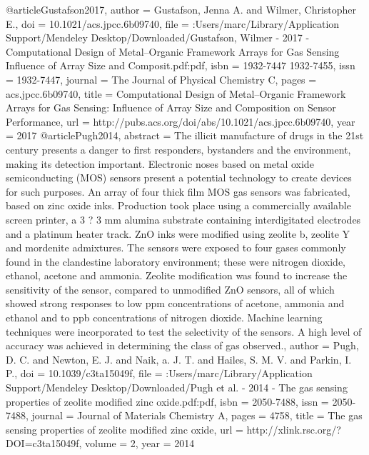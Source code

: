 @article{Gustafson2017,
author = {Gustafson, Jenna A. and Wilmer, Christopher E.},
doi = {10.1021/acs.jpcc.6b09740},
file = {:Users/marc/Library/Application Support/Mendeley Desktop/Downloaded/Gustafson, Wilmer - 2017 - Computational Design of Metal–Organic Framework Arrays for Gas Sensing Influence of Array Size and Composit.pdf:pdf},
isbn = {1932-7447
1932-7455},
issn = {1932-7447},
journal = {The Journal of Physical Chemistry C},
pages = {acs.jpcc.6b09740},
title = {{Computational Design of Metal–Organic Framework Arrays for Gas Sensing: Influence of Array Size and Composition on Sensor Performance}},
url = {http://pubs.acs.org/doi/abs/10.1021/acs.jpcc.6b09740},
year = {2017}
}
@article{Pugh2014,
abstract = {The illicit manufacture of drugs in the 21st century presents a danger to first responders, bystanders and the environment, making its detection important. Electronic noses based on metal oxide semiconducting (MOS) sensors present a potential technology to create devices for such purposes. An array of four thick film MOS gas sensors was fabricated, based on zinc oxide inks. Production took place using a commercially available screen printer, a 3 ? 3 mm alumina substrate containing interdigitated electrodes and a platinum heater track. ZnO inks were modified using zeolite b, zeolite Y and mordenite admixtures. The sensors were exposed to four gases commonly found in the clandestine laboratory environment; these were nitrogen dioxide, ethanol, acetone and ammonia. Zeolite modification was found to increase the sensitivity of the sensor, compared to unmodified ZnO sensors, all of which showed strong responses to low ppm concentrations of acetone, ammonia and ethanol and to ppb concentrations of nitrogen dioxide. Machine learning techniques were incorporated to test the selectivity of the sensors. A high level of accuracy was achieved in determining the class of gas observed.},
author = {Pugh, D. C. and Newton, E. J. and Naik, a. J. T. and Hailes, S. M. V. and Parkin, I. P.},
doi = {10.1039/c3ta15049f},
file = {:Users/marc/Library/Application Support/Mendeley Desktop/Downloaded/Pugh et al. - 2014 - The gas sensing properties of zeolite modified zinc oxide.pdf:pdf},
isbn = {2050-7488},
issn = {2050-7488},
journal = {Journal of Materials Chemistry A},
pages = {4758},
title = {{The gas sensing properties of zeolite modified zinc oxide}},
url = {http://xlink.rsc.org/?DOI=c3ta15049f},
volume = {2},
year = {2014}
}
